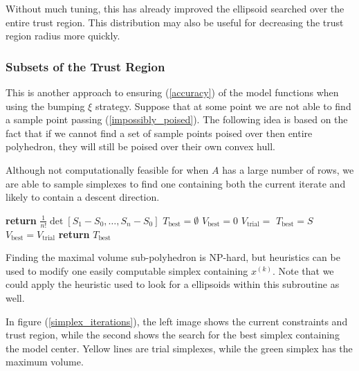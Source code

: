 \documentclass{article}
\theoremstyle{case}
\newcommand{\iteratek}{{x}^{(k)}}
\newcommand{\outertrk}{{T^{(k)}}_{\text{out}}}
\let\oldref\ref
\renewcommand{\ref}[1]{(\oldref{#1})}
\begin{document}
Without much tuning, this has already improved the ellipsoid searched over the entire trust region.
This distribution may also be useful for decreasing the trust region radius more quickly.


\subsubsection{Subsets of the Trust Region}
\label{simplex_subset_algorithm}

This is another approach to ensuring \ref{accuracy} of the model functions when using the bumping $\xi$ strategy.
Suppose that at some point we are not able to find a sample point passing \ref{impossibly_poised}.
The following idea is based on the fact that if we cannot find a set of sample points poised over then entire polyhedron, they will still be poised over their own convex hull.

Although not computationally feasible for when $A$ has a large number of rows, we are able to sample simplexes to find one containing both the current iterate and likely to contain a descent direction.

\begin{algorithmic}
    \State \textbf{return} $\frac 1 {n!} \det{[S_1 - S_0, \ldots, S_n - S_0]}$
\EndProcedure
{}
    \State $T_{\text{best}} = \emptyset$
    \State $V_{\text{best}} = 0$
    \ForAll{$S \subset \outertrk \cap X$ a simplex}
        \EndIf
        \EndIf
        \State $V_{\text{trial}} = $ 
            \State $T_{\text{best}} = S$
            \State $V_{\text{best}} = V_{\text{trial}}$
        \EndIf{}
    \EndFor
    \State \textbf{return} $T_{\text{best}}$
\EndProcedure
\end{algorithmic}


Finding the maximal volume sub-polyhedron is NP-hard, but heuristics can be used to modify one easily computable simplex containing $\iteratek$.
Note that we could apply the heuristic used to look for a ellipsoids within this subroutine as well.

In figure \ref{simplex_iterations}, the left image shows the current constraints and trust region, while the second shows the search for the best simplex containing the model center.
Yellow lines are trial simplexes, while the green simplex has the maximum volume.
\end{document}

